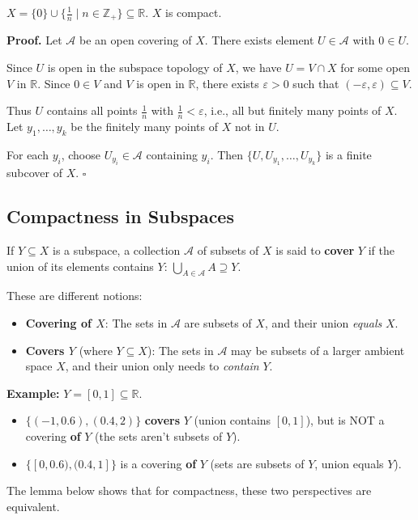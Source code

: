 \documentclass[11pt]{report}
\renewenvironment{proof}[1][Proof]{\noindent\textbf{#1.} }{\hfill$\square$\par\vspace{5pt}}
\begin{document}
\begin{exbox}
$X = \{0\} \cup \{\frac{1}{n} \mid n \in \mathbb{Z}_+\} \subseteq \mathbb{R}$. $X$ is compact.
\end{exbox}

\begin{proof}
Let $\mathcal{A}$ be an open covering of $X$. There exists element $U \in \mathcal{A}$ with $0 \in U$. 

Since $U$ is open in the subspace topology of $X$, we have $U = V \cap X$ for some open $V$ in $\mathbb{R}$. Since $0 \in V$ and $V$ is open in $\mathbb{R}$, there exists $\varepsilon > 0$ such that $(-\varepsilon, \varepsilon) \subseteq V$. 

Thus $U$ contains all points $\frac{1}{n}$ with $\frac{1}{n} < \varepsilon$, i.e., all but finitely many points of $X$. Let $y_1, \ldots, y_k$ be the finitely many points of $X$ not in $U$.

For each $y_i$, choose $U_{y_i} \in \mathcal{A}$ containing $y_i$. Then $\{U, U_{y_1}, \ldots, U_{y_k}\}$ is a finite subcover of $X$.
\end{proof}

\subsection{Compactness in Subspaces}

\begin{defbox}
If $Y \subseteq X$ is a subspace, a collection $\mathcal{A}$ of subsets of $X$ is said to \textbf{cover} $Y$ if the union of its elements contains $Y$: $\bigcup_{A \in \mathcal{A}} A \supseteq Y$.
\end{defbox}

\begin{rembox}
These are different notions:
\begin{itemize}
    \item \textbf{Covering of $X$}: The sets in $\mathcal{A}$ are subsets of $X$, and their union \emph{equals} $X$.
    \item \textbf{Covers $Y$} (where $Y \subseteq X$): The sets in $\mathcal{A}$ may be subsets of a larger ambient space $X$, and their union only needs to \emph{contain} $Y$.
\end{itemize}

\textbf{Example:} $Y = [0,1] \subseteq \mathbb{R}$.
\begin{itemize}
    \item $\{(-1, 0.6), (0.4, 2)\}$ \textbf{covers} $Y$ (union contains $[0,1]$), but is NOT a covering \textbf{of} $Y$ (the sets aren't subsets of $Y$).
    \item $\{[0, 0.6), (0.4, 1]\}$ is a covering \textbf{of} $Y$ (sets are subsets of $Y$, union equals $Y$).
\end{itemize}

The lemma below shows that for compactness, these two perspectives are equivalent.
\end{rembox}
\end{document}
